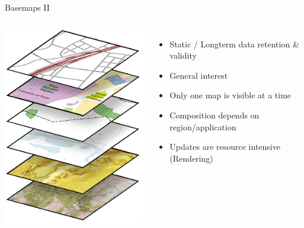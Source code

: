 \documentclass{beamer}
\begin{document}
\begin{frame}{Basemaps II}
 \begin{columns}
   \includegraphics[scale=0.5]{images/basemap_layers}
   \begin{itemize}
    \item Static / Longterm data retention & validity
    \item General interest
    \item Only one map is visible at a time
    \item Composition depends on region/application
    \item Updates are resource intensive (Rendering)
   \end{itemize}
 \end{columns}
\end{frame}
\end{document}
